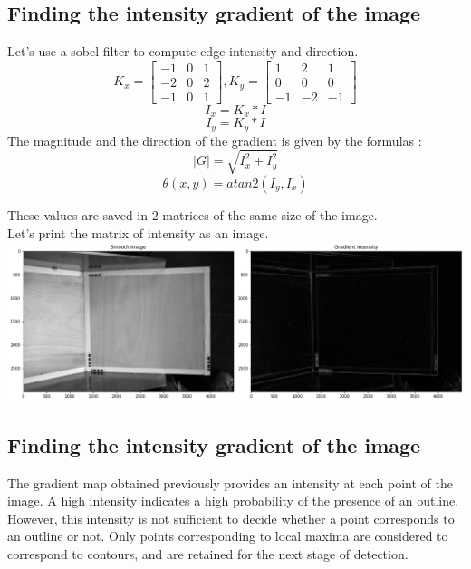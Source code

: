 \documentclass{article}
\begin{document}
\subsection{Finding the intensity gradient of the image}

Let's use a sobel filter to compute edge intensity and direction.
$$ K_x = \begin{bmatrix} -1 & 0 & 1 \\ -2 & 0 & 2 \\ -1 & 0 & 1 \end{bmatrix} , K_y = \begin{bmatrix} 1 & 2 & 1 \\ 0 & 0 & 0 \\ -1 & -2 & -1 \end{bmatrix} $$
$$ I_x = K_x * I $$
$$ I_y = K_y * I $$
The magnitude and the direction of the gradient is given by the formulas :
$$ |G| = \sqrt{I_x^2 + I_y^2} $$
$$ \theta(x, y) = atan2(I_y, I_x) $$
\vspace{1 cm}

These values are saved in $2$ matrices of the same size of the image.\\
Let's print the matrix of intensity as an image.\\

\includegraphics[width=14cm]{images/img6.png}

\subsection{Finding the intensity gradient of the image}

The gradient map obtained previously provides an intensity at each point of the image. A high intensity indicates a high probability of the presence of an outline. However, this intensity is not sufficient to decide whether a point corresponds to an outline or not. Only points corresponding to local maxima are considered to correspond to contours, and are retained for the next stage of detection.\\
\end{document}

